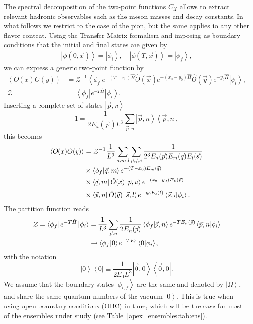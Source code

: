The spectral decomposition of the two-point functions $C_X$ allows to extract relevant hadronic observables such as the meson masses and decay constants. In what follows we restrict to the case of the pion, but the same applies to any other flavor content. Using the Transfer Matrix formalism and imposing as boundary conditions that the initial and final states are given by
\begin{gather}
\left|\phi(0,\vec{x})\right>=\left|\phi_i\right>, \quad \left|\phi(T,\vec{x})\right>=\left|\phi_f\right>,
\end{gather}
we can express a generic two-point function by
\begin{align}
\label{ch_observables:eq:spectral}
\left<O(x)O(y)\right>&=\mathcal{Z}^{-1}\left<\phi_f\right|e^{-(T-x_0)\hat{H}}\hat{O}(\vec{x})e^{-(x_0-y_0)\hat{H}}\hat{O}(\vec{y})e^{-y_0\hat{H}}\left|\phi_i\right>, \\
\mathcal{Z}&=\left<\phi_f\right|e^{-T\hat{H}}\left|\phi_i\right>.
\end{align}
Inserting a complete set of states $\left|\vec{p},n\right>$
\begin{equation}
1=\frac{1}{2E_n(\vec{p})L^3}\sum_{\vec{p},n}\left|\vec{p},n\right>\left<\vec{p},n\right|,
\end{equation}
this becomes
\begin{align}
\left<O(x)O(y)\right>&=\mathcal{Z}^{-1}\frac{1}{L^9}\sum_{n,m,l}\sum_{\vec{p},\vec{q},\vec{s}}\frac{1}{2^3E_n(\vec{p})E_m(\vec{q})E_l(\vec{s})} \notag \\
&\times\left<\phi_f|\vec{q},m\right>e^{-(T-x_0)E_m(\vec{q})} \notag \\
&\times\left<\vec{q},m\right|\hat{O}(\vec{x})\left|\vec{p},n\right>e^{-(x_0-y_0)E_n(\vec{p})} \notag \\
&\times\left<\vec{p},n\right|\hat{O}(\vec{y})\left|\vec{s},l\right>e^{-y_0E_s(\vec{l})}\left<\vec{s},l|\phi_i\right>. 
\end{align}
The partition function reads
\begin{align}
\mathcal{Z}=\left<\phi_f\right|e^{-T\hat{H}}\left|\phi_i\right>&=\frac{1}{L^3}\sum_{\vec{p},n}\frac{1}{2E_n(\vec{p})}\left<\phi_f|\vec{p},n\right>e^{-TE_n(\vec{p})}\left<\vec{p},n|\phi_i\right> \notag \\
&\rightarrow\left<\phi_f|0\right>e^{-TE_0}\left<0|\phi_i\right>,
\end{align}
with the notation
\begin{equation}
\left|0\right>\left<0\right|\equiv\frac{1}{2E_0L^3}\left|\vec{0},0\right>\left<\vec{0},0\right|.
\end{equation}
We assume that the boundary states $\left|\phi_{i,f}\right>$ are the same and denoted by $\left|\Omega\right>$, and share the same quantum numbers of the vacuum $\left|0\right>$. This is true when using open boundary conditions (OBC) in time, which will be the case for most of the ensembles under study (see Table~\ref{apex_ensembles:tab:ens}).

